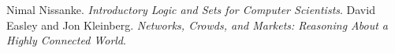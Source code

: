 \begin{thebibliography}{ABC}	
     Nimal Nissanke. \emph{Introductory Logic and Sets for Computer Scientists}.
     David Easley and Jon Kleinberg. \emph{Networks, Crowds, and Markets: Reasoning About a Highly Connected World}.
\end{thebibliography}
